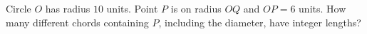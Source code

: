Circle $O$ has radius $10$ units. Point $P$ is on radius $OQ$ and $OP=6$ units. How many different chords containing $P$, including the diameter, have integer lengths?
